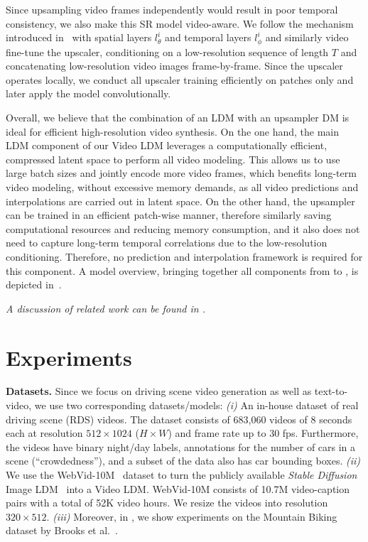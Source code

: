 Since upsampling video frames independently would result in poor temporal consistency, we also
make this SR model video-aware. We follow the mechanism introduced in~ with spatial layers $l_\theta^i$ and temporal layers $l_\phi^i$ and similarly video fine-tune the upscaler, conditioning on a low-resolution sequence of length $T$ and concatenating low-resolution video images frame-by-frame. 
Since the upscaler operates locally, we conduct all upscaler training efficiently on patches only and later apply the model convolutionally.

Overall, we believe that the combination of an LDM with an upsampler DM is ideal for efficient high-resolution video synthesis. On the one hand, the main LDM component of our Video LDM leverages a computationally efficient, compressed latent space to perform all video modeling. This allows us to use large batch sizes and jointly encode more video frames, which benefits long-term video modeling, without excessive memory demands, as all video predictions and interpolations are carried out in latent space. On the other hand, the upsampler can be trained in an efficient patch-wise manner, therefore similarly saving computational resources and reducing memory consumption, and it also does not need to capture long-term temporal correlations due to the low-resolution conditioning. Therefore, no prediction and interpolation framework is required for this component. A model overview, bringing together all components from  to , is depicted in~.

\textit{A discussion of related work can be found in .}

\vspace{-1mm}
\section{Experiments}\label{sec:experiments}
\vspace{-1mm}
\textbf{Datasets.} Since we focus on driving scene video generation as well as text-to-video, we use two corresponding datasets/models: \textit{(i)} An in-house dataset of real driving scene (RDS) videos. The dataset consists of 683,060 videos of 8 seconds each at resolution $512\times1024$ ($H\times W$) and frame rate up to 30 fps. Furthermore, the videos have binary night/day labels, annotations for the number of cars in a scene (``crowdedness''), and a subset of the data also has car bounding boxes. \textit{(ii)} We use the  WebVid-10M~\cite{bain21frozen} dataset to turn the publicly available \textit{Stable Diffusion} Image LDM~\cite{rombach2021highresolution} into a Video LDM. WebVid-10M consists of 10.7M video-caption pairs with a total of 52K video hours. We resize the videos into resolution $320\times512$. 
\textit{(iii)} Moreover, in , we show experiments on the Mountain Biking dataset by Brooks et al.~\cite{brooks2022generating}. %

